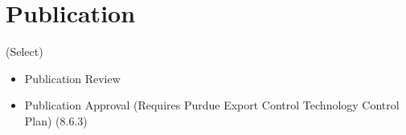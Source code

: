\section{Publication}
(Select)
\begin{itemize}
    \item  Publication Review
    \item Publication Approval (Requires Purdue Export Control Technology Control Plan) (8.6.3)
\end{itemize}
